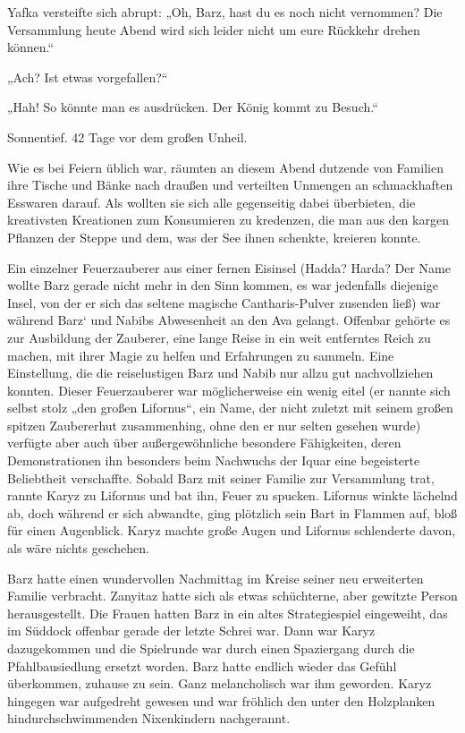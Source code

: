 Yafka versteifte sich abrupt: „Oh, Barz, hast du es noch nicht vernommen? Die Versammlung heute Abend wird sich leider nicht um eure Rückkehr drehen können.“

„Ach? Ist etwas vorgefallen?“

„Hah! So könnte man es ausdrücken. Der König kommt zu Besuch.“\bigskip







Sonnentief. 42 Tage vor dem großen Unheil.\bigskip



Wie es bei Feiern üblich war, räumten an diesem Abend dutzende von Familien ihre Tische und Bänke nach draußen und verteilten Unmengen an schmackhaften Esswaren darauf. Als wollten sie sich alle gegenseitig dabei überbieten, die kreativsten Kreationen zum Konsumieren zu kredenzen, die man aus den kargen Pflanzen der Steppe und dem, was der See ihnen schenkte, kreieren konnte.

Ein einzelner Feuerzauberer aus einer fernen Eisinsel (Hadda? Harda? Der Name wollte Barz gerade nicht mehr in den Sinn kommen, es war jedenfalls diejenige Insel, von der er sich das seltene magische Cantharis-Pulver zusenden ließ) war während Barz‘ und Nabibs Abwesenheit an den Ava gelangt. Offenbar gehörte es zur Ausbildung der Zauberer, eine lange Reise in ein weit entferntes Reich zu machen, mit ihrer Magie zu helfen und Erfahrungen zu sammeln. Eine Einstellung, die die reiselustigen Barz und Nabib nur allzu gut nachvollziehen konnten. Dieser Feuerzauberer war möglicherweise ein wenig eitel (er nannte sich selbst stolz „den großen Lifornus“, ein Name, der nicht zuletzt mit seinem großen spitzen Zaubererhut zusammenhing, ohne den er nur selten gesehen wurde) verfügte aber auch über außergewöhnliche besondere Fähigkeiten, deren Demonstrationen ihn besonders beim Nachwuchs der Iquar eine begeisterte Beliebtheit verschaffte. Sobald Barz mit seiner Familie zur Versammlung trat, rannte Karyz zu Lifornus und bat ihn, Feuer zu spucken. Lifornus winkte lächelnd ab, doch während er sich abwandte, ging plötzlich sein Bart in Flammen auf, bloß für einen Augenblick. Karyz machte große Augen und Lifornus schlenderte davon, als wäre nichts geschehen.

Barz hatte einen wundervollen Nachmittag im Kreise seiner neu erweiterten Familie verbracht. Zanyitaz hatte sich als etwas schüchterne, aber gewitzte Person herausgestellt. Die Frauen hatten Barz in ein altes Strategiespiel eingeweiht, das im Süddock offenbar gerade der letzte Schrei war. Dann war Karyz dazugekommen und die Spielrunde war durch einen Spaziergang durch die Pfahlbausiedlung ersetzt worden. Barz hatte endlich wieder das Gefühl überkommen, zuhause zu sein. Ganz melancholisch war ihm geworden. Karyz hingegen war aufgedreht gewesen und war fröhlich den unter den Holzplanken hindurchschwimmenden Nixenkindern nachgerannt.

